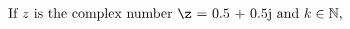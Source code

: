 \documentclass[preview]{standalone}
\begin{document}
\begin{align*}
\text{If $z$ is the complex number \z = 0.5 + 0.5j \text{and $k \in \mathbb{N}$, }}
\end{align*}
\end{document}
